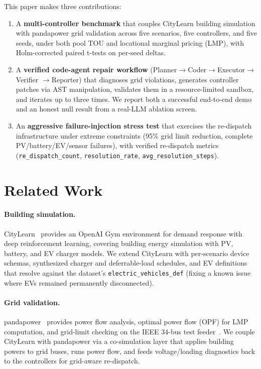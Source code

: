 \documentclass[sigconf,nonacm]{acmart}
\begin{document}
This paper makes three contributions:

\begin{enumerate}
\item A \textbf{multi-controller benchmark} that couples CityLearn building
  simulation with pandapower grid validation across five scenarios, five
  controllers, and five seeds, under both pool TOU and locational marginal
  pricing (LMP), with Holm-corrected paired t-tests on per-seed deltas.
\item A \textbf{verified code-agent repair workflow}
  (Planner$\rightarrow$Coder$\rightarrow$Executor$\rightarrow$Verifier%
  $\rightarrow$Reporter) that diagnoses grid violations, generates controller
  patches via AST manipulation, validates them in a resource-limited sandbox,
  and iterates up to three times. We report both a successful end-to-end demo
  and an honest null result from a real-LLM ablation screen.
\item An \textbf{aggressive failure-injection stress test} that exercises the
  re-dispatch infrastructure under extreme constraints (95\% grid limit
  reduction, complete PV/battery/EV/sensor failures), with verified
  re-dispatch metrics (\texttt{re\_dispatch\_count},
  \texttt{resolution\_rate}, \texttt{avg\_resolution\_steps}).
\end{enumerate}

\section{Related Work}\label{sec:related}

\paragraph{Building simulation.} CityLearn~\cite{citylearn2021} provides an
OpenAI Gym environment for demand response with deep reinforcement learning,
covering building energy simulation with PV, battery, and EV charger models.
We extend CityLearn with per-scenario device schemas, synthesized charger and
deferrable-load schedules, and EV definitions that resolve against the
dataset's \texttt{electric\_vehicles\_def} (fixing a known issue where EVs
remained permanently disconnected).

\paragraph{Grid validation.} pandapower~\cite{pandapower2018} provides power
flow analysis, optimal power flow (OPF) for LMP computation, and grid-limit
checking on the IEEE 34-bus test feeder~\cite{ieee34bus}. We couple CityLearn
with pandapower via a co-simulation layer that applies building powers to grid
buses, runs power flow, and feeds voltage/loading diagnostics back to the
controllers for grid-aware re-dispatch.
\end{document}
